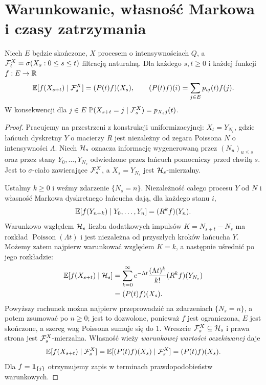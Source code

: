 \section{Warunkowanie, własność Markowa i czasy zatrzymania}
\begin{twierdzenie}
Niech $E$ będzie skończone, $X$ procesem o intensywnościach $Q$,
a $\mathcal{F}_t^X=\sigma(X_s:0\le s\le t)$ filtracją naturalną.
Dla każdego $s,t\ge0$ i każdej funkcji $f:E\to\mathbb{R}$
\[
\mathbb{E}[f(X_{s+t})\mid\mathcal{F}_s^X]=(P(t)f)(X_s),\qquad
(P(t)f)(i)=\sum_{j\in E}p_{ij}(t)f(j).
\]
W konsekwencji dla $j\in E$
$\mathbb{P}(X_{s+t}=j\mid\mathcal{F}_s^X)=p_{X_sj}(t)$.
\end{twierdzenie}
\begin{proof}
Pracujemy na przestrzeni z konstrukcji uniformizacyjnej:
$X_t=Y_{N_t}$, gdzie łańcuch dyskretny $Y$ o macierzy $R$
jest niezależny od zegara Poissona $N$ o intensywności $\Lambda$.
Niech $\mathcal{H}_s$ oznacza informację wygenerowaną przez
$(N_u)_{u\le s}$ oraz przez stany $Y_0,\ldots,Y_{N_s}$
odwiedzone przez łańcuch pomocniczy przed chwilą $s$.
Jest to $\sigma$-ciało zawierające $\mathcal{F}_s^X$,
a $X_s=Y_{N_s}$ jest $\mathcal{H}_s$-mierzalny.

Ustalmy $k\ge0$ i weźmy zdarzenie $\{N_s=n\}$.
Niezależność całego procesu $Y$ od $N$ i własność
Markowa dyskretnego łańcucha dają, dla każdego stanu $i$,
\[
\mathbb{E}[f(Y_{n+k})\mid Y_0,\ldots,Y_n]=(R^kf)(Y_n).
\]
Warunkowo względem $\mathcal{H}_s$ liczba dodatkowych impulsów
$K=N_{s+t}-N_s$ ma rozkład $\operatorname{Poisson}(\Lambda t)$
i jest niezależna od przyszłych kroków łańcucha $Y$.
Możemy zatem najpierw warunkować względem $K=k$,
a następnie uśrednić po jego rozkładzie:
\[
\begin{aligned}
\mathbb{E}[f(X_{s+t})\mid\mathcal{H}_s]
 &=\sum_{k=0}^\infty
 e^{-\Lambda t}\frac{(\Lambda t)^k}{k!}
 (R^kf)(Y_{N_s})\\
 &= (P(t)f)(X_s).
\end{aligned}
\]
Powyższy rachunek można najpierw przeprowadzić na zdarzeniach
$\{N_s=n\}$, a potem zsumować po $n\ge0$; jest to dozwolone,
ponieważ $f$ jest ograniczona, $E$ jest skończone,
a szereg wag Poissona sumuje się do $1$.
Wreszcie $\mathcal{F}_s^X\subseteq\mathcal{H}_s$ i prawa strona
jest $\mathcal{F}_s^X$-mierzalna. Własność wieży
\emph{warunkowej wartości oczekiwanej} daje
\[
\mathbb{E}[f(X_{s+t})\mid\mathcal{F}_s^X]
=\mathbb{E}[(P(t)f)(X_s)\mid\mathcal{F}_s^X]
=(P(t)f)(X_s).
\]
Dla $f=\mathbf{1}_{\{j\}}$ otrzymujemy zapis
w terminach prawdopodobieństw warunkowych.
\end{proof}


